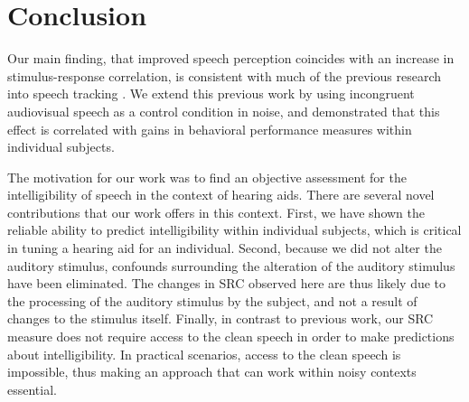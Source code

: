 \documentclass[10pt,letterpaper]{article}
\begin{document}
\section{Conclusion}

  Our main finding, that improved speech perception coincides with an increase 
  in stimulus-response correlation, is consistent with much of the previous 
  research into speech tracking
  \cite{Ding2013,Peelle2013,Vanthornhout2017,Crosse2015}. 
  We extend this previous work by using incongruent audiovisual speech as a 
  control condition in noise, and demonstrated that this effect is correlated 
  with gains in behavioral performance measures within individual subjects.


  The motivation for our work was to find an objective assessment for the 
  intelligibility of speech in the context of hearing aids. There are several
  novel contributions that our work offers in this context. First, we have 
  shown the reliable ability to predict intelligibility within individual 
  subjects, which is critical in tuning a hearing aid for an individual. 
  Second, because we did not alter the auditory stimulus, confounds surrounding
  the alteration of the auditory stimulus have been eliminated. The changes 
  in SRC observed here are thus likely due to the processing of the auditory
  stimulus by the subject, and not a result of changes to the stimulus itself.
  Finally, in contrast to previous work, our SRC measure does not require
  access to the clean speech in order to make predictions about intelligibility.
  In practical scenarios, access to the clean speech is impossible, thus making
  an approach that can work within noisy contexts essential.




\setlength{\bibleftmargin}{.125in}
\setlength{\bibindent}{-\bibleftmargin}


\end{document}
